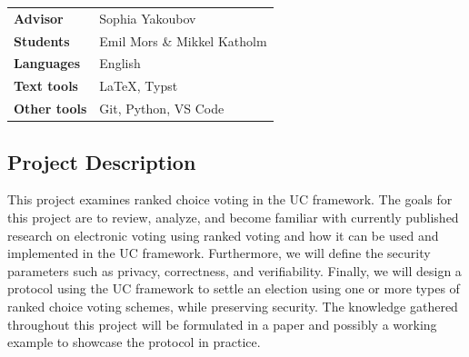 \documentclass{article}
\begin{document}
\pagestyle{fancy}

\bgroup{}
\begin{table}[h]
\begin{tabular}{ll}
\textbf{Advisor}     & Sophia Yakoubov  \\
\textbf{Students}    & Emil Mors \& Mikkel Katholm  \\
\textbf{Languages}   & English \\
\textbf{Text tools}  & \LaTeX, Typst         \\
\textbf{Other tools} & Git, Python, VS Code
\end{tabular}
\end{table}
\egroup\vspace{-0.cm}

\subsection*{Project Description}
This project examines ranked choice voting in the UC framework. The goals for this project are to review, analyze, and become familiar with currently published research on electronic voting using ranked voting and how it can be used and implemented in the UC framework. Furthermore, we will define the security parameters such as privacy, correctness, and verifiability. Finally, we will design a protocol using the UC framework to settle an election using one or more types of ranked choice voting schemes, while preserving security. The knowledge gathered throughout this project will be formulated in a paper and possibly a working example to showcase the protocol in practice.
\end{document}
